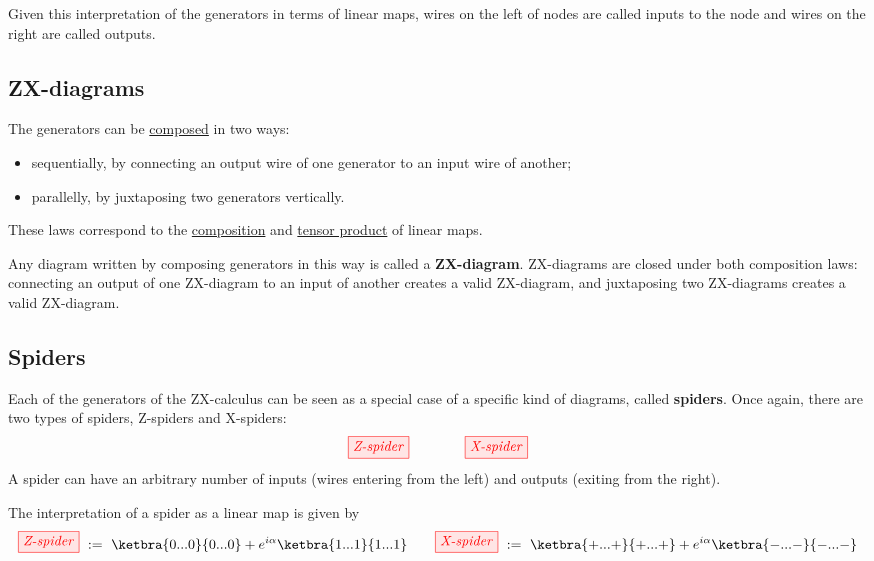 \documentclass[a4paper, 12pt]{article}
\begin{document}
Given this interpretation of the generators in terms of linear maps, wires on
the left of nodes are called inputs to the node and wires
on the right are called outputs.



\subsection{ZX-diagrams}

The generators can be \underline{composed} in two ways:
\begin{itemize}
\item sequentially, by connecting an output wire of one generator to an input
  wire of another;
\item parallelly, by juxtaposing two generators vertically.
\end{itemize}
These laws correspond to the \underline{composition} and \underline{tensor
  product} of linear maps.

Any diagram written by composing generators in this way is called a
\textbf{ZX-diagram}.
ZX-diagrams are closed under both composition laws: connecting
an output of one ZX-diagram to an input of another creates a valid ZX-diagram,
and juxtaposing two ZX-diagrams creates a valid ZX-diagram.


\subsection{Spiders}

Each of the generators of the ZX-calculus can be seen as a special case of a
specific kind of diagrams, called \textbf{spiders}.
Once again, there are two types of spiders, Z-spiders and X-spiders:
\begin{equation*}
    \tikzfig{Z-spider} \qquad \qquad \tikzfig{X-spider}
\end{equation*}
A spider can have an arbitrary number of inputs (wires entering from the left)
and outputs (exiting from the right).

The interpretation of a spider as a linear map is given by
\begin{equation*}
    \tikzfig{Z-spider}\ := \ \ketbra{0...0}{0...0} +
e^{i \alpha} \ketbra{1...1}{1...1} \hfill
\qquad
\hfill \tikzfig{X-spider} \ := \ \ketbra{+...+}{+...+} +
e^{i \alpha} \ketbra{-...-}{-...-}
\end{equation*}
\end{document}
